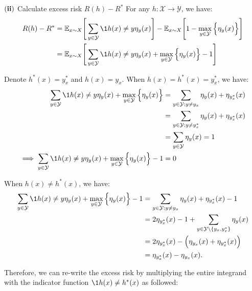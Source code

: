 \begin{solution*}
    \begin{subproof}{\newline $\bf (ii)$ Calculate excess risk $R(h) - R^*$}
        For any $h:\mathcal{X}\to\mathcal{Y}$, we have:
        \begin{align*}
            R(h) - R^* 
                &= \mathbb{E}_{x\sim X}\Bigg[
                    \sum_{y\in\mathcal{Y}} \1{h(x) \ne y}\eta_y(x)
                \Bigg] - \mathbb{E}_{x\sim X}\Bigg[ 1 - \max_{y\in\mathcal{Y}}\Big\{ \eta_y(x) \Big\}\Bigg] \\
                &= \mathbb{E}_{x\sim X}\Bigg[
                    \sum_{y\in\mathcal{Y}} \1{h(x) \ne y}\eta_y(x) + \max_{y\in\mathcal{Y}}\Big\{ \eta_y(x) \Big\} - 1
                \Bigg]
        \end{align*}

        \noindent Denote $h^*(x) = y^*_x$ and $h(x)=y_x$. When $h(x) = h^*(x) = y^*_x$, we have:
        \begin{align*}
            \sum_{y\in\mathcal{Y}} \1{h(x) \ne y}\eta_y(x) + \max_{y\in\mathcal{Y}}\Big\{ \eta_y(x) \Big\} 
                &=\sum_{y\in\mathcal{Y}; y\ne y_x}\eta_y(x) + \eta_{y^*_x}(x) \\
                &=\sum_{y\in\mathcal{Y}; y\ne y^*_x}\eta_y(x) + \eta_{y^*_x}(x) \\
                &=\sum_{y\in\mathcal{Y}}\eta_y(x)=1 \\
            \implies \sum_{y\in\mathcal{Y}} \1{h(x) \ne y}\eta_y(x) + \max_{y\in\mathcal{Y}}\Big\{ \eta_y(x) \Big\} - 1 &= 0
        \end{align*}

        \noindent\newline When $h(x) \ne h^*(x)$, we have:
        \begin{align*}
            \sum_{y\in\mathcal{Y}} \1{h(x) \ne y}\eta_y(x) + \max_{y\in\mathcal{Y}}\Big\{ \eta_y(x) \Big\} - 1
                &= \sum_{y\in\mathcal{Y}; y\ne y_x}\eta_y(x) + \eta_{y^*_x}(x) - 1 \\
                &= 2\eta_{y^*_x}(x) - 1 + \sum_{y\in\mathcal{Y}\setminus\{y_x, y_x^*\}}\eta_y(x) \\
                &= 2\eta_{y^*_x}(x) - \Big( \eta_{y_x}(x) + \eta_{y_x^*}(x) \Big) \\
                &= \eta_{y^*_x}(x) - \eta_{y_x}(x)
                .
        \end{align*}

        \noindent Therefore, we can re-write the excess risk by multiplying the entire integrand with the indicator function $\1{h(x)\ne h^*(x)}$ as followed:


\end{subproof}
\end{solution*}
